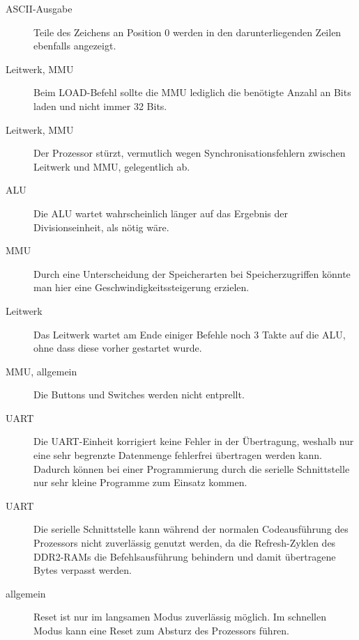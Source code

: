 \begin{description}
\item[ASCII-Ausgabe] Teile des Zeichens an Position 0 werden in den
darunterliegenden Zeilen ebenfalls angezeigt.
\item[Leitwerk, MMU] Beim LOAD-Befehl sollte die MMU lediglich die ben\"otigte
Anzahl an Bits laden und nicht immer 32 Bits.
\item[Leitwerk, MMU] Der Prozessor st\"urzt, vermutlich wegen
Synchronisationsfehlern zwischen Leitwerk und MMU, gelegentlich ab.
\item[ALU] Die ALU wartet wahrscheinlich l\"anger auf das Ergebnis der
Divisionseinheit, als n\"otig w\"are.
\item[MMU] Durch eine Unterscheidung der Speicherarten bei Speicherzugriffen
k\"onnte man hier eine Geschwindigkeitssteigerung erzielen.
\item[Leitwerk] Das Leitwerk wartet am Ende einiger Befehle noch 3 Takte auf
die ALU, ohne dass diese vorher gestartet wurde.
\item[MMU, allgemein] Die Buttons und Switches werden nicht entprellt.
\item[UART] Die UART-Einheit korrigiert keine Fehler in der \"Ubertragung,
weshalb nur eine sehr begrenzte Datenmenge fehlerfrei \"ubertragen werden kann.
Dadurch k\"onnen bei einer Programmierung durch die serielle Schnittstelle nur
sehr kleine Programme zum Einsatz kommen.
\item[UART] Die serielle Schnittstelle kann w\"ahrend der normalen
Codeausf\"uhrung des Prozessors nicht zuverl\"assig genutzt werden, da die
Refresh-Zyklen des DDR2-RAMs die Befehlsausf\"uhrung behindern und damit
\"ubertragene Bytes verpasst werden.
\item[allgemein] Reset ist nur im langsamen Modus zuverl\"assig m\"oglich. Im
schnellen Modus kann eine Reset zum Absturz des Prozessors f\"uhren.
\end{description}
